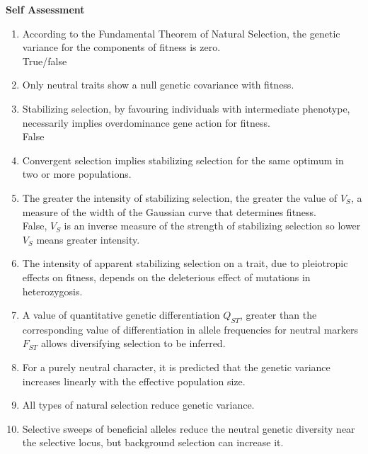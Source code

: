 \documentclass[12pt]{amsart}
\begin{document}
{\large \bf Self Assessment}
\begin{enumerate}
\item According to the Fundamental Theorem of Natural Selection, the genetic variance for the components of fitness is zero.\\
True/false\\
\item Only neutral traits show a null genetic covariance with fitness.\\
\item Stabilizing selection, by favouring individuals with intermediate phenotype, necessarily implies overdominance gene action for fitness.\\
False
\item Convergent selection implies stabilizing selection for the same optimum in two or more populations.
\item The greater the intensity of stabilizing selection, the greater the value of $V_S$, a measure of the width of the Gaussian curve that determines fitness.\\
False, $V_S$ is an inverse measure of the strength of stabilizing selection so lower $V_S$ means greater intensity.\\
\item The intensity of apparent stabilizing selection on a trait, due to pleiotropic effects on fitness, depends on the deleterious effect of mutations in heterozygosis.\\
\item A value of quantitative genetic differentiation $Q_{ST}$, greater than the corresponding value of differentiation in allele frequencies for neutral markers $F_{ST}$ allows diversifying selection to be inferred.\\
\item For a purely neutral character, it is predicted that the genetic variance increases linearly with the effective population size.\\
\item All types of natural selection reduce genetic variance.\\
\item Selective sweeps of beneficial alleles reduce the neutral genetic diversity near the selective locus, but background selection can increase it.\\
\medskip
\end{enumerate}
\end{document}
